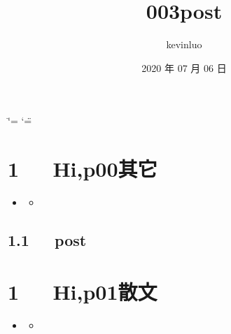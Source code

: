 \documentclass[letterpaper,12pt,english]{sphinxmanual}
\title{003post}
\date{2020 年 07 月 06 日}
\author{kevinluo}
\begin{document}
\ifdefined\shorthandoff
  \ifnum\catcode`\=\string=\active\shorthandoff{=}\fi
  \ifnum\catcode`\"=\active{}\fi
\fi

\pagestyle{empty}
\sphinxmaketitle
\pagestyle{plain}
\sphinxtableofcontents
\pagestyle{normal}
\label{\detokenize{index::doc}}



\chapter{1   Hi,p00其它}
\label{\detokenize{p00_u5176_u5b83/Hello_uff0cp00_u5176_u5b83:hi-p00}}\label{\detokenize{p00_u5176_u5b83/Hello_uff0cp00_u5176_u5b83::doc}}
\begin{sphinxShadowBox}
\begin{itemize}
\item {} 
\label{\detokenize{p00_u5176_u5b83/Hello_uff0cp00_u5176_u5b83:id2}}{\hyperref[\detokenize{p00_u5176_u5b83/Hello_uff0cp00_u5176_u5b83:hi-p00}]{}}
\begin{itemize}
\item {} 
\label{\detokenize{p00_u5176_u5b83/Hello_uff0cp00_u5176_u5b83:id3}}{\hyperref[\detokenize{p00_u5176_u5b83/Hello_uff0cp00_u5176_u5b83:post}]{}}

\end{itemize}

\end{itemize}
\end{sphinxShadowBox}


\section{1.1   post}
\label{\detokenize{p00_u5176_u5b83/Hello_uff0cp00_u5176_u5b83:post}}

\chapter{1   Hi,p01散文}
\label{\detokenize{p01_u6563_u6587/Hello_uff0cp01_u6563_u6587:hi-p01}}\label{\detokenize{p01_u6563_u6587/Hello_uff0cp01_u6563_u6587::doc}}
\begin{sphinxShadowBox}
\begin{itemize}
\item {} 
\label{\detokenize{p01_u6563_u6587/Hello_uff0cp01_u6563_u6587:id2}}{\hyperref[\detokenize{p01_u6563_u6587/Hello_uff0cp01_u6563_u6587:hi-p01}]{}}
\begin{itemize}
\item {} 
\label{\detokenize{p01_u6563_u6587/Hello_uff0cp01_u6563_u6587:id3}}{\hyperref[\detokenize{p01_u6563_u6587/Hello_uff0cp01_u6563_u6587:post}]{}}

\end{itemize}

\end{itemize}
\end{sphinxShadowBox}
\end{document}

